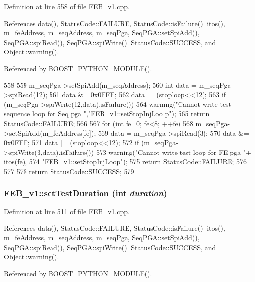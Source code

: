 Definition at line 558 of file FEB\_\-v1.cpp.

References data(), StatusCode::FAILURE, StatusCode::isFailure(), itos(), m\_\-feAddress, m\_\-seqAddress, m\_\-seqPga, SeqPGA::setSpiAdd(), SeqPGA::spiRead(), SeqPGA::spiWrite(), StatusCode::SUCCESS, and Object::warning().

Referenced by BOOST\_\-PYTHON\_\-MODULE().


\begin{DoxyCode}
558                                               {
559   m_seqPga->setSpiAdd(m_seqAddress);
560   int data = m_seqPga->spiRead(12);
561   data &= 0x0FFF;
562   data |= (stoploop<<12);
563   if (m_seqPga->spiWrite(12,data).isFailure()){
564     warning("Cannot write test sequence loop for Seq pga ","FEB_v1::setStopInjLoo
      p");
565     return StatusCode::FAILURE;
566   }
567   for (int fe=0; fe<8; ++fe){
568     m_seqPga->setSpiAdd(m_feAddress[fe]);
569     data = m_seqPga->spiRead(3);
570     data &= 0x0FFF;
571     data |= (stoploop<<12);
572     if (m_seqPga->spiWrite(3,data).isFailure()){
573       warning("Cannot write test loop for FE pga "+ itos(fe),
574           "FEB_v1::setStopInjLoop");
575       return StatusCode::FAILURE;
576     }
577   }
578   return StatusCode::SUCCESS;
579 }
\end{DoxyCode}
\hypertarget{classFEB__v1_a19d3dee6fa47408cf0aa136fb99ebe1c}{
\subsubsection[{setTestDuration}]{ FEB\_\-v1::setTestDuration (int {\em duration})}}
\label{classFEB__v1_a19d3dee6fa47408cf0aa136fb99ebe1c}


Definition at line 511 of file FEB\_\-v1.cpp.

References data(), StatusCode::FAILURE, StatusCode::isFailure(), itos(), m\_\-feAddress, m\_\-seqAddress, m\_\-seqPga, SeqPGA::setSpiAdd(), SeqPGA::spiRead(), SeqPGA::spiWrite(), StatusCode::SUCCESS, and Object::warning().

Referenced by BOOST\_\-PYTHON\_\-MODULE().


